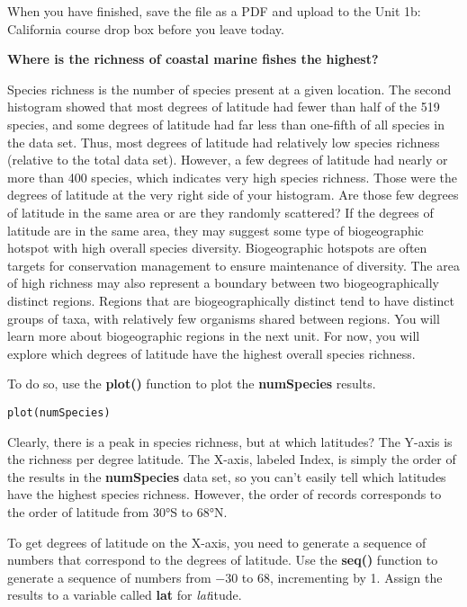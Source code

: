 \documentclass[11pt]{article}
\begin{document}



When you have finished, save the file as a PDF and upload to the Unit
1b: California course drop box before you leave today.

\textbf{Where is the richness of coastal marine fishes the highest?}

Species richness is the number of species present at a given location.
The second histogram showed that most degrees of latitude had fewer than
half of the 519 species, and some degrees of latitude had far less than
one-fifth of all species in the data set. Thus, most degrees of latitude
had relatively low species richness (relative to the total data set).
However, a few degrees of latitude had nearly or more than 400 species,
which indicates very high species richness. Those were the degrees of
latitude at the very right side of your histogram. Are those few degrees
of latitude in the same area or are they randomly scattered? If the
degrees of latitude are in the same area, they may suggest some type of
biogeographic hotspot with high overall species diversity. Biogeographic
hotspots are often targets for conservation management to ensure
maintenance of diversity. The area of high richness may also represent a
boundary between two biogeographically distinct regions. Regions that
are biogeographically distinct tend to have distinct groups of taxa,
with relatively few organisms shared between regions. You will learn
more about biogeographic regions in the next unit. For now, you will
explore which degrees of latitude have the highest overall species
richness.

To do so, use the \textbf{plot()} function to plot the
\textbf{numSpecies} results.

\texttt{plot(numSpecies)}

Clearly, there is a peak in species richness, but at which latitudes?
The Y-axis is the richness per degree latitude. The X-axis, labeled
Index, is simply the order of the results in the \textbf{numSpecies}
data set, so you can't easily tell which latitudes have the highest
species richness. However, the order of records corresponds to the order
of latitude from 30°S to 68°N.

To get degrees of latitude on the X-axis, you need to generate a
sequence of numbers that correspond to the degrees of latitude. Use the \textbf{seq()} function to generate a
sequence of numbers from $\minus$30 to 68, incrementing by 1. Assign the
results to a variable called \textbf{lat} for \emph{lat}itude.
\end{document}
